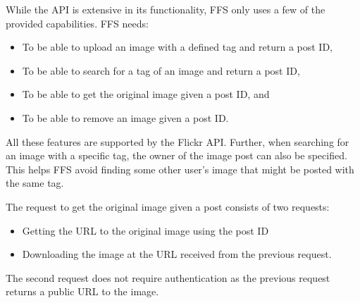 While the API is extensive in its functionality, FFS only uses a few of the provided capabilities. FFS needs:
\begin{itemize}
	\item To be able to upload an image with a defined tag and return a post ID,
	\item To be able to search for a tag of an image and return a post ID,
	\item To be able to get the original image given a post ID, and
	\item To be able to remove an image given a post ID.
\end{itemize}
All these features are supported by the Flickr API. Further, when searching for an image with a specific tag, the owner of the image post can also be specified. This helps FFS avoid finding some other user's image that might be posted with the same tag. 

The request to get the original image given a post consists of two requests:
\begin{itemize}
	\item Getting the URL to the original image using the post ID
	\item Downloading the image at the URL received from the previous request.
\end{itemize}
The second request does not require authentication as the previous request returns a public URL to the image. 